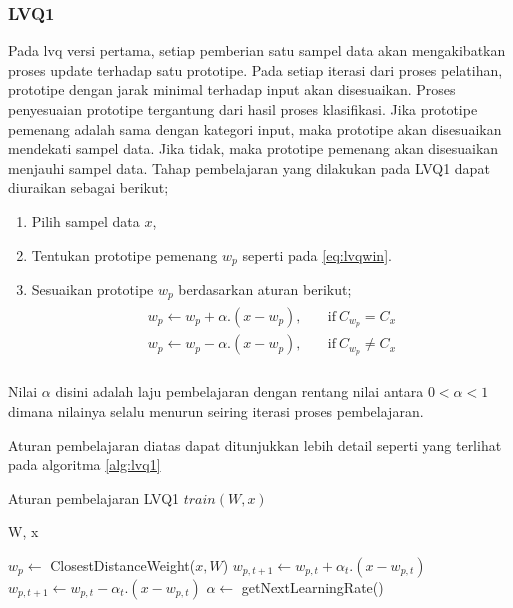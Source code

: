 \subsubsection*{LVQ1}
Pada \gls{lvq} versi pertama, setiap pemberian satu sampel data akan
mengakibatkan proses update terhadap satu prototipe. Pada setiap iterasi dari
proses pelatihan, prototipe dengan jarak minimal terhadap input
akan disesuaikan. Proses penyesuaian prototipe tergantung dari hasil proses
klasifikasi. Jika prototipe pemenang adalah sama dengan kategori input, maka
prototipe akan disesuaikan mendekati sampel data. Jika tidak, maka prototipe
pemenang akan disesuaikan menjauhi sampel data. Tahap pembelajaran yang
dilakukan pada LVQ1 dapat diuraikan sebagai berikut;
\begin{enumerate}
  \setlength{\itemsep}{1pt}
  \setlength{\parskip}{0pt}
  \setlength{\parsep}{0pt}
  \item Pilih sampel data $x$,
  \item Tentukan prototipe pemenang $w_p$ seperti pada \ref{eq:lvqwin}.
  \item Sesuaikan prototipe $w_p$ berdasarkan aturan berikut;
  \begin{align}
  \label{eq:lvq1}
  \begin{array}{ll}
  	w_p \leftarrow w_p + \alpha . (x - w_p), &\quad \text{if}\ C_{w_p} = C_x \\
  	w_p \leftarrow w_p - \alpha . (x - w_p), &\quad \text{if}\ C_{w_p} \neq C_x
  	\\
  \end{array}
  \end{align} 
\end{enumerate}

\noindent Nilai $\alpha$ disini adalah laju pembelajaran dengan rentang nilai
antara $0 < \alpha < 1$ dimana nilainya selalu menurun seiring iterasi proses
pembelajaran.

\noindent 
Aturan pembelajaran diatas dapat ditunjukkan lebih detail seperti
yang terlihat pada algoritma \ref{alg:lvq1}
\begin{algorithm}  
\scriptsize 
\caption{Aturan pembelajaran LVQ1 $train(W, x)$}          
\label{alg:lvq1}                           
\begin{algorithmic}                    %
	\REQUIRE W, x
	
	\STATE $w_p \leftarrow $ ClosestDistanceWeight($x, W$)
		\STATE $w_{p, t+1} \leftarrow w_{p,t} + \alpha_t . (x - w_{p,t})$
		\STATE $w_{p, t+1} \leftarrow w_{p,t} - \alpha_t . (x - w_{p,t})$
	\ENDIF	
	\STATE $\alpha \leftarrow $ getNextLearningRate()
\end{algorithmic}
\end{algorithm}

